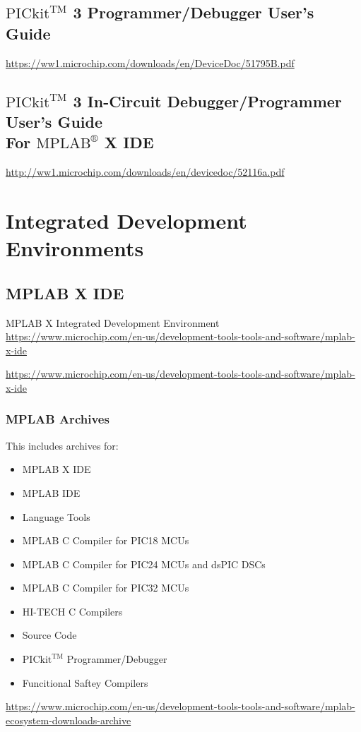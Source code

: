 \documentclass[12pt, letterpaper]{article}
\begin{document}
\subsection{$\text{PICkit}^{\text{TM}}$ 3 Programmer/Debugger User's Guide}
\url{https://ww1.microchip.com/downloads/en/DeviceDoc/51795B.pdf}
\subsection{$\text{PICkit}^{\text{TM}}$ 3 In-Circuit Debugger/Programmer User's Guide\\
For $\text{MPLAB}^{\circledR}$ X IDE}
\url{http://ww1.microchip.com/downloads/en/devicedoc/52116a.pdf}

\section{Integrated Development Environments}
\subsection{MPLAB X\textregistered \smallskip{} IDE}
MPLAB X\textregistered \smallskip{} Integrated Development Environment\\
\url{https://www.microchip.com/en-us/development-tools-tools-and-software/mplab-x-ide}

\url{https://www.microchip.com/en-us/development-tools-tools-and-software/mplab-x-ide}
\subsubsection{MPLAB Archives}
This includes archives for:
\begin{itemize}
  \item MPLAB X IDE
  \item MPLAB IDE
  \item Language Tools
  \item MPLAB C Compiler for PIC18 MCUs
  \item MPLAB C Compiler for PIC24 MCUs and dsPIC\textregistered \smallskip{} DSCs
  \item MPLAB C Compiler for PIC32 MCUs
  \item HI-TECH C Compilers
  \item Source Code
  \item $\text{PICkit}^{\text{TM}}$ Programmer/Debugger
  \item Funcitional Saftey Compilers
\end{itemize}
\url{https://www.microchip.com/en-us/development-tools-tools-and-software/mplab-ecosystem-downloads-archive}
\end{document}
